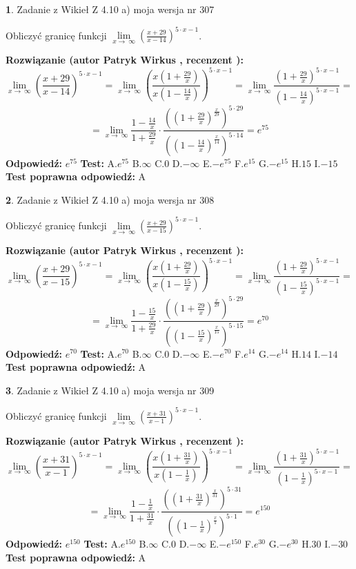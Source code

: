 \documentclass[12pt, a4paper]{article}
\theoremstyle{definition} %
\newtheorem{zad}{}
\newcommand{\zadStart}[1]{\begin{zad}#1\newline}
\newcommand{\zadStop}{\end{zad}}
\newcommand{\rozwStart}[2]{\noindent \textbf{Rozwiązanie (autor #1 , recenzent #2): }\newline}
\newcommand{\rozwStop}{\newline}
\newcommand{\odpStart}{\noindent \textbf{Odpowiedź:}\newline}
\newcommand{\odpStop}{\newline}
\newcommand{\testStart}{\noindent \textbf{Test:}\newline}
\newcommand{\testStop}{\newline}
\newcommand{\kluczStart}{\noindent \textbf{Test poprawna odpowiedź:}\newline}
\newcommand{\kluczStop}{\newline}
\begin{document}
\zadStart{Zadanie z Wikieł Z 4.10 a) moja wersja nr 307}

Obliczyć granicę funkcji  $\lim\limits_{x\to\ \infty}(\frac{x+29}{x-14})^{5\cdot x-1}$.
\zadStop
\rozwStart{Patryk Wirkus}{}
$$\lim\limits_{x\to\ \infty}(\frac{x+29}{x-14})^{5\cdot x-1} = \lim\limits_{x\to\ \infty}(\frac{x(1+\frac{29}{x})}{x(1-\frac{14}{x})})^{5\cdot x-1}=\lim\limits_{x\to\ \infty}\frac{(1+\frac{29}{x})^{5\cdot x-1}}{(1-\frac{14}{x})^{5\cdot x-1}}=$$
$$=\lim\limits_{x\to\ \infty}\frac{1-\frac{14}{x}}{1+\frac{29}{x}}\cdot\frac{((1+\frac{29}{x})^{\frac{x}{29}})^{5\cdot29}}{((1-\frac{14}{x})^{\frac{x}{14}})^{5\cdot14}}=e^{75}$$
\rozwStop
\odpStart
$e^{75}$
\odpStop
\testStart
A.$e^{75}$ B.$\infty$ C.$0$ D.$-\infty$ E.$-e^{75}$
F.$e^{15}$ G.$-e^{15}$
H.$15$
I.$-15$
\testStop
\kluczStart
A
\kluczStop



\zadStart{Zadanie z Wikieł Z 4.10 a) moja wersja nr 308}

Obliczyć granicę funkcji  $\lim\limits_{x\to\ \infty}(\frac{x+29}{x-15})^{5\cdot x-1}$.
\zadStop
\rozwStart{Patryk Wirkus}{}
$$\lim\limits_{x\to\ \infty}(\frac{x+29}{x-15})^{5\cdot x-1} = \lim\limits_{x\to\ \infty}(\frac{x(1+\frac{29}{x})}{x(1-\frac{15}{x})})^{5\cdot x-1}=\lim\limits_{x\to\ \infty}\frac{(1+\frac{29}{x})^{5\cdot x-1}}{(1-\frac{15}{x})^{5\cdot x-1}}=$$
$$=\lim\limits_{x\to\ \infty}\frac{1-\frac{15}{x}}{1+\frac{29}{x}}\cdot\frac{((1+\frac{29}{x})^{\frac{x}{29}})^{5\cdot29}}{((1-\frac{15}{x})^{\frac{x}{15}})^{5\cdot15}}=e^{70}$$
\rozwStop
\odpStart
$e^{70}$
\odpStop
\testStart
A.$e^{70}$ B.$\infty$ C.$0$ D.$-\infty$ E.$-e^{70}$
F.$e^{14}$ G.$-e^{14}$
H.$14$
I.$-14$
\testStop
\kluczStart
A
\kluczStop



\zadStart{Zadanie z Wikieł Z 4.10 a) moja wersja nr 309}

Obliczyć granicę funkcji  $\lim\limits_{x\to\ \infty}(\frac{x+31}{x-1})^{5\cdot x-1}$.
\zadStop
\rozwStart{Patryk Wirkus}{}
$$\lim\limits_{x\to\ \infty}(\frac{x+31}{x-1})^{5\cdot x-1} = \lim\limits_{x\to\ \infty}(\frac{x(1+\frac{31}{x})}{x(1-\frac{1}{x})})^{5\cdot x-1}=\lim\limits_{x\to\ \infty}\frac{(1+\frac{31}{x})^{5\cdot x-1}}{(1-\frac{1}{x})^{5\cdot x-1}}=$$
$$=\lim\limits_{x\to\ \infty}\frac{1-\frac{1}{x}}{1+\frac{31}{x}}\cdot\frac{((1+\frac{31}{x})^{\frac{x}{31}})^{5\cdot31}}{((1-\frac{1}{x})^{\frac{x}{1}})^{5\cdot1}}=e^{150}$$
\rozwStop
\odpStart
$e^{150}$
\odpStop
\testStart
A.$e^{150}$ B.$\infty$ C.$0$ D.$-\infty$ E.$-e^{150}$
F.$e^{30}$ G.$-e^{30}$
H.$30$
I.$-30$
\testStop
\kluczStart
A
\kluczStop
\end{document}

